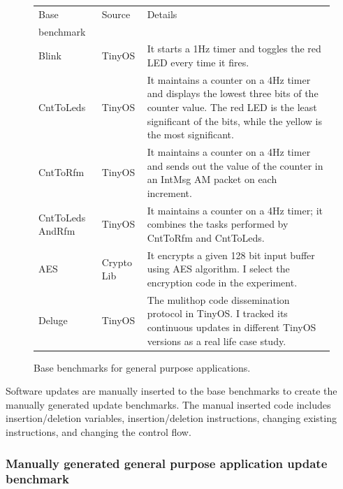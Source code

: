 \begin{figure}[htbp]
\centering
\begin{small}
\begin{tabular}{||p{1in}|p{0.5in}|p{4in}||} 
\hline
Base  & Source & Details \\ 
benchmark & & \\\hline  \hline

Blink & TinyOS & It starts a 1Hz timer and toggles the red
LED every time it fires. \\ \hline

CntToLeds & TinyOS & It maintains a counter on a 4Hz timer and
displays the lowest three bits of the counter value. The red LED is
the least significant of the bits, while the yellow is the most
significant. \\ \hline

CntToRfm & TinyOS & It maintains a counter on a 4Hz timer and sends
out the value of the counter in an IntMsg AM packet on each
increment. \\ \hline

CntToLeds AndRfm & TinyOS & It maintains a counter on a 4Hz timer; it
combines the tasks performed by CntToRfm and CntToLeds. \\ \hline

AES & Crypto Lib & It encrypts a given 128 bit input buffer using AES
algorithm. I select the encryption code in the experiment.\\ \hline \hline

Deluge & TinyOS & The mulithop code dissemination protocol in TinyOS. I tracked its continuous updates in different TinyOS versions as a real life case study. \\ \hline
\end{tabular}
\end{small}
\caption{Base benchmarks for general purpose applications.}
\label{fbench}
\end{figure}

Software updates are manually inserted to the base benchmarks to create the
manually generated update benchmarks.
The manual inserted code includes insertion/deletion variables, 
insertion/deletion instructions, changing 
existing instructions, and changing the control flow. 



\subsubsection{Manually generated general purpose application update benchmark}


